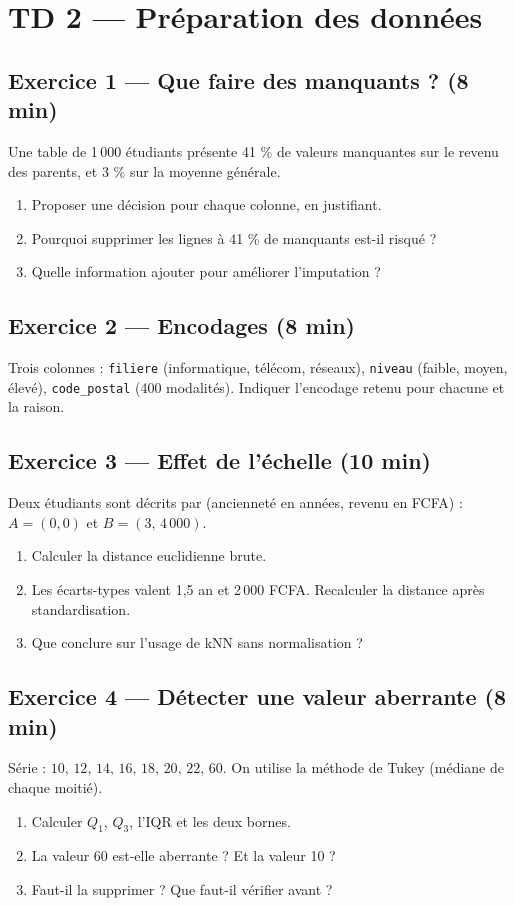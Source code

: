 \section*{TD 2 --- Préparation des données}

\subsection*{Exercice 1 --- Que faire des manquants ? \hfill \normalfont\footnotesize (8 min)}
Une table de 1\,000 étudiants présente 41 \% de valeurs manquantes sur le
revenu des parents, et 3 \% sur la moyenne générale.
\begin{enumerate}
  \item Proposer une décision pour chaque colonne, en justifiant.
  \item Pourquoi supprimer les lignes à 41 \% de manquants est-il risqué ?
  \item Quelle information ajouter pour améliorer l'imputation ?
\end{enumerate}

\subsection*{Exercice 2 --- Encodages \hfill \normalfont\footnotesize (8 min)}
Trois colonnes : \texttt{filiere} (informatique, télécom, réseaux),
\texttt{niveau} (faible, moyen, élevé), \texttt{code\_postal} (400 modalités).
Indiquer l'encodage retenu pour chacune et la raison.

\subsection*{Exercice 3 --- Effet de l'échelle \hfill \normalfont\footnotesize (10 min)}
Deux étudiants sont décrits par (ancienneté en années, revenu en FCFA) :
$A=(0,0)$ et $B=(3,\,4\,000)$.
\begin{enumerate}
  \item Calculer la distance euclidienne brute.
  \item Les écarts-types valent 1,5 an et 2\,000 FCFA. Recalculer la distance
        après standardisation.
  \item Que conclure sur l'usage de kNN sans normalisation ?
\end{enumerate}

\subsection*{Exercice 4 --- Détecter une valeur aberrante \hfill \normalfont\footnotesize (8 min)}
Série : $10,\,12,\,14,\,16,\,18,\,20,\,22,\,60$. On utilise la méthode de Tukey
(médiane de chaque moitié).
\begin{enumerate}
  \item Calculer $Q_1$, $Q_3$, l'IQR et les deux bornes.
  \item La valeur 60 est-elle aberrante ? Et la valeur 10 ?
  \item Faut-il la supprimer ? Que faut-il vérifier avant ?
\end{enumerate}


